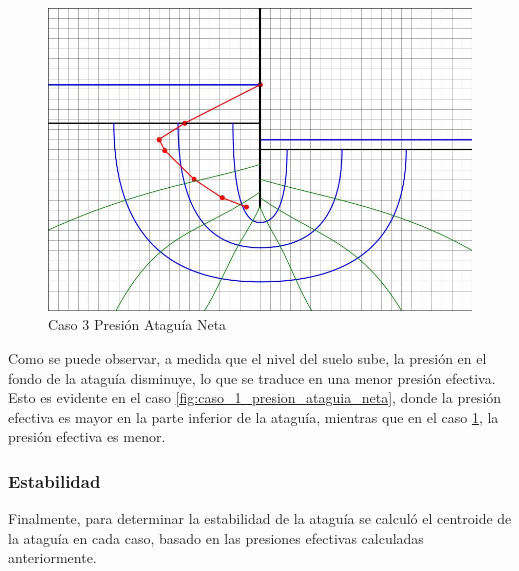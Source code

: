 \begin{figure}[H]
\begin{minipage}{0.32\textwidth}
        \centering
        \includegraphics[width=\textwidth]{GRAFICOS/caso_3_presion_ataguia_neta.jpg}
        \caption{Caso 3 Presión Ataguía Neta}
        \label{fig:caso_3_presion_ataguia_neta}
    \end{minipage}
\end{figure}

Como se puede observar, a medida que el nivel del suelo sube, la presión en el fondo de la ataguía disminuye, lo que se traduce en una menor presión efectiva. Esto es evidente en el caso \ref{fig:caso_1_presion_ataguia_neta}, donde la presión efectiva es mayor en la parte inferior de la ataguía, mientras que en el caso \ref{fig:caso_3_presion_ataguia_neta}, la presión efectiva es menor.

\subsubsection{Estabilidad}
Finalmente, para determinar la estabilidad de la ataguía se calculó el centroide de la ataguía en cada caso, basado en las presiones efectivas calculadas anteriormente.

